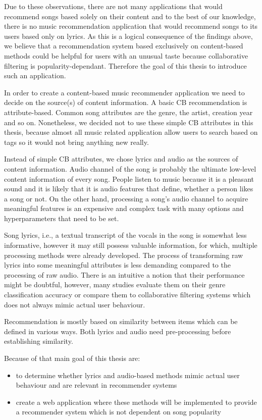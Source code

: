 Due to these observations, there are not many applications that would recommend songs based solely on their content and to the best of our knowledge, there is no music recommendation application that would recommend songs to its users based only on lyrics. As this is a logical consequence of the findings above, we believe that a recommendation system based exclusively on content-based methods could be helpful for users with an unusual taste because collaborative filtering is popularity-dependant. Therefore the goal of this thesis to introduce such an application. 

In order to create a content-based music recommender application we need to decide on the source(s) of content information. A basic CB recommendation is attribute-based. Common song attributes are the genre, the artist, creation year and so on. Nonetheless, we decided not to use these simple CB attributes in this thesis, because almost all music related application allow users to search based on tags so it would not bring anything new really. 

Instead of simple CB attributes, we chose lyrics and audio as the sources of content information. Audio channel of the song is probably the ultimate low-level content information of every song. People listen to music because it is a pleasant sound and it is likely that it is audio features that define, whether a person likes a song or not. On the other hand, processing a song's audio channel to acquire meaningful features is an expensive and complex task with many options and hyperparameters that need to be set.

Song lyrics, i.e., a textual transcript of the vocals in the song is somewhat less informative, however it may still possess valuable information, for which, multiple processing methods were already developed. The process of transforming raw lyrics into some meaningful attributes is less demanding compared to the processing of raw audio. There is an intuitive a notion that their performance might be doubtful, however, many studies evaluate them on their genre classification accuracy \cite{DBLP:journals/corr/Tsaptsinos17} or compare them to collaborative filtering systems \cite{Gossi2016LyricBasedMR} which does not always mimic actual user behaviour.

Recommendation is mostly based on similarity between items which can be defined in various ways. Both lyrics and audio need pre-processing before establishing similarity. 

Because of that main goal of this thesis are:
\begin{itemize}
    \item to determine whether lyrics and audio-based methods mimic actual user behaviour and are relevant in recommender systems
    \item create a web application where these methods will be implemented to provide a recommender system which is not dependent on song popularity
\end{itemize}

